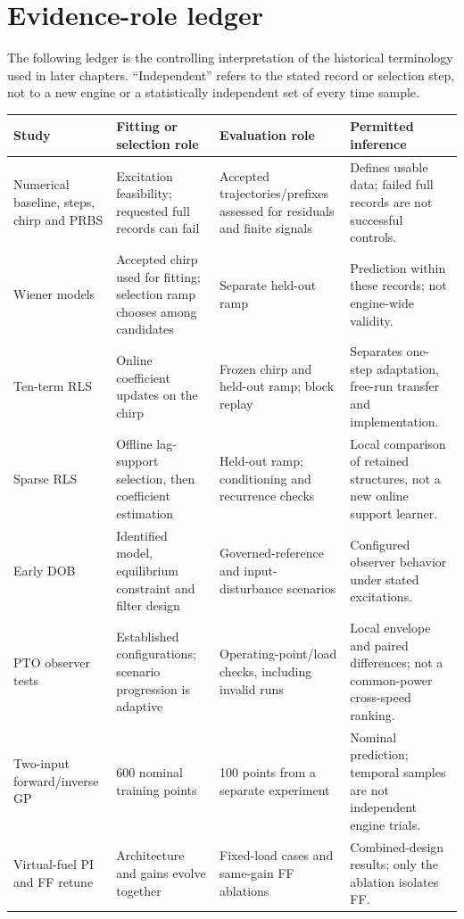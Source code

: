 \section{Evidence-role ledger}
The following ledger is the controlling interpretation of the historical terminology used in later chapters. ``Independent'' refers to the stated record or selection step, not to a new engine or a statistically independent set of every time sample.

\small
\begin{longtable}{@{}p{.19\linewidth}p{.27\linewidth}p{.23\linewidth}p{.23\linewidth}@{}}
\toprule Study & Fitting or selection role & Evaluation role & Permitted inference\\\midrule\endhead
Numerical baseline, steps, chirp and PRBS & Excitation feasibility; requested full records can fail & Accepted trajectories/prefixes assessed for residuals and finite signals & Defines usable data; failed full records are not successful controls.\\
Wiener models & Accepted chirp used for fitting; selection ramp chooses among candidates & Separate held-out ramp & Prediction within these records; not engine-wide validity.\\
Ten-term RLS & Online coefficient updates on the chirp & Frozen chirp and held-out ramp; block replay & Separates one-step adaptation, free-run transfer and implementation.\\
Sparse RLS & Offline lag-support selection, then coefficient estimation & Held-out ramp; conditioning and recurrence checks & Local comparison of retained structures, not a new online support learner.\\
Early DOB & Identified model, equilibrium constraint and filter design & Governed-reference and input-disturbance scenarios & Configured observer behavior under stated excitations.\\
PTO observer tests & Established configurations; scenario progression is adaptive & Operating-point/load checks, including invalid runs & Local envelope and paired differences; not a common-power cross-speed ranking.\\
Two-input forward/inverse GP & 600 nominal training points & 100 points from a separate experiment & Nominal prediction; temporal samples are not independent engine trials.\\
Virtual-fuel PI and FF retune & Architecture and gains evolve together & Fixed-load cases and same-gain FF ablations & Combined-design results; only the ablation isolates FF.\\

\end{longtable}
